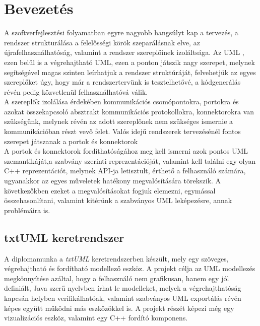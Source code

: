\documentclass[a4paper,12pt]{report}
\begin{document}

\cleardoublepage

\tableofcontents

\chapter{Bevezetés}
A szoftverfejlesztési folyamatban egyre nagyobb hangsúlyt kap a tervezés, a rendszer strukturálása a felelősségi körök szeparálásnak elve, az újrafelhasználhatóság, valamint a rendszer szereplőinek izoláltsága. Az UML \cite{uml_omg}, ezen belül is a végrehajtható UML, ezen a ponton játszik nagy szerepet, melynek segítségével magas szinten leírhatjuk a rendszer struktúráját, felvehetjük az egyes szereplőket úgy, hogy már a rendszertervünk is tesztelhetővé, a kódgenerálás révén pedig közvetlenül felhasználhatóvá válik. \\ A szereplők izolálása érdekében kommunikációs csomópontokra, portokra és azokat összekapcsoló absztrakt kommunikációs protokollokra, konnektorokra van szükségünk, melynek révén az adott szereplőnek nem szükséges ismernie a kommunikációban részt vevő felet. Valós idejű rendszerek tervezésénél fontos szerepet játszanak a portok és konnektorok \cite{uml_real}\\ 
A portok és konnektorok fordíthatóságához meg kell ismerni azok pontos UML szemantikáját,a szabvány szerinti reprezentációját, valamint kell találni egy olyan C++ reprezentációt, melynek API-ja letisztult, érthető a felhasználó számára, ugyanakkor az egyes műveletek hatékony megvalósítására törekszik. A következőkben ezeket a megvalósításokat fogjuk elemezni, egymással összehasonlítani, valamint kitérünk a szabványos UML leképezésre, annak problémáira is. \\

\section{txtUML keretrendszer}
A diplomamunka a \textit{txtUML} keretrendszerben készült, mely egy szöveges, végrehajtható és fordítható modellező eszköz. A projekt célja az UML modellezés megkönnyítése azáltal, hogy a felhasználó nem grafikusan, hanem egy jól definiált, Java szerű nyelvben írhat le modelleket, melyek a végrehajthatóság kapcsán helyben verifikálhatóak, valamint szabványos UML exportálás révén képes együtt működni más eszközökkel is. A projekt részét képezi még egy vizualizációs eszköz, valamint egy C++ fordító komponens.\\
\end{document}
